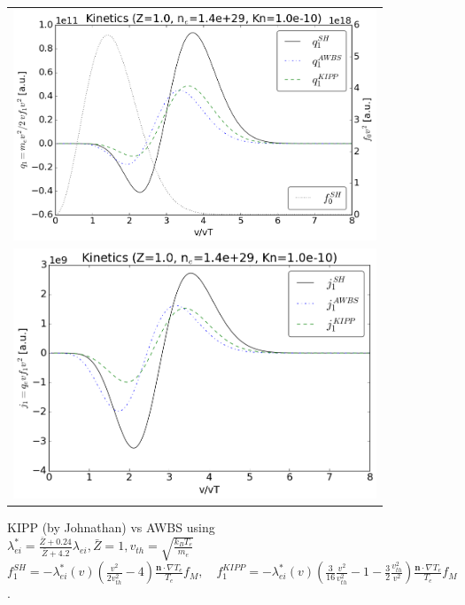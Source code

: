 \documentclass[preprint,12pt]{elsarticle}
\newcommand{\vect}[1]{\boldsymbol{#1}}
\newcommand{\mfpei}{\lambda_{ei}}
\newcommand{\Zbar}{\bar{Z}}
\newcommand{\vth}{v_{th}}
\newcommand{\vn}{\vect{n}}
\newcommand{\me}{m_e}
\newcommand{\kB}{k_B}
\newcommand{\fM}{f_M}
\newcounter{bla}
\begin{document}
\begin{figure}[tbh]
  \begin{center}
    \begin{tabular}{c}
      \includegraphics[width=1.0\textwidth]{../VFPdata/KIPP_q_kinetics.png} \\
      \includegraphics[width=1.0\textwidth]{../VFPdata/KIPP_j_kinetics.png}
    \end{tabular}
  \caption{KIPP (by Johnathan) vs AWBS using 
  $\mfpei^* = \frac{\Zbar + 0.24}{\Zbar + 4.2}\mfpei, \Zbar=1, 
  \vth = \sqrt{\frac{\kB T_e}{\me}}$ 
  $f_1^{SH} = -\mfpei^*(v) \left(\frac{v^2}{2 \vth^2} - 4\right) 
  \frac{\vn\cdot\nabla T_e}{T_e} \fM,\quad 
  f_1^{KIPP} = -\mfpei^*(v) \left(\frac{3}{16}\frac{v^2}{\vth^2} - 1 
  - \frac{3}{2}\frac{\vth^2}{v^2} \right) 
  \frac{\vn\cdot\nabla T_e}{T_e} \fM$.
  }
  \end{center}
  \label{fig:AWBScorrection_f1}
\end{figure}
\end{document}
